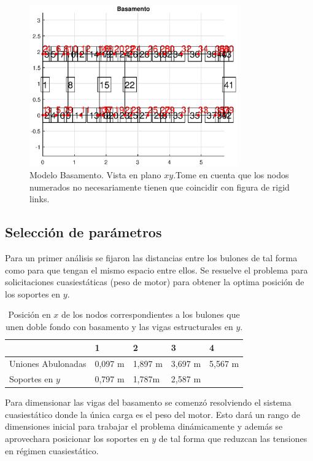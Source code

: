 \documentclass[onecolumn,10pt,titlepage,a4paper]{article}
\begin{document}
\begin{figure}[htb!]
	\centering
	\includegraphics[width=0.8\textwidth]{fig/modelbasamento.eps}
	\caption{Modelo Basamento. Vista en plano $x\!y$.Tome en cuenta que los nodos numerados no necesariamente tienen que coincidir con figura de rigid links.}
	\label{fig:modelobasamento}
\end{figure}

\subsection*{Selección de parámetros}
Para un primer análisis se fijaron las distancias entre los bulones de tal forma como para que tengan el mismo espacio entre ellos. Se resuelve el problema para solicitaciones cuasiestáticas (peso de motor) para obtener la optima posición de los soportes en $y$.


\begin{table}[htb!]
	\centering
	\begin{tabular}{lllll}
		& 1 & 2 & 3 & 4 \\ \hline
		Uniones Abulonadas& 0,097 \si{\meter}  & 1,897 \si{ \meter} & 3,697 \si{ \meter} & 5,567 \si{ \meter} \\
		Soportes en $y$& 0,797 \si{\meter}  &1,787\si{\meter}   & 2,587 \si{\meter}  &  \\
	\end{tabular}
\caption{Posición en $x$ de los nodos correspondientes a los bulones que unen doble fondo con basamento y las vigas estructurales en $y$.}
\end{table}

Para dimensionar las vigas del basamento se comenzó resolviendo el sistema cuasiestático donde la única carga es el peso del motor. Esto dará un rango de dimensiones inicial para trabajar el problema dinámicamente y además se aprovechara posicionar los soportes en $y$ de tal forma que reduzcan las tensiones en régimen cuasiestático. 
\end{document}

